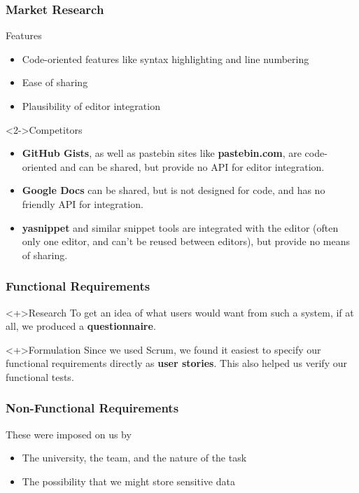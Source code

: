 
\begin{frame}
  \frametitle{Market Research}

  \begin{block}{Features}
    \begin{itemize}
      \item Code-oriented features like syntax highlighting and line numbering
      \item Ease of sharing
      \item Plausibility of editor integration
    \end{itemize}
  \end{block}

  \begin{block}<2->{Competitors}
    \begin{itemize}
      \item<-2> \textbf{GitHub Gists}, as well as pastebin sites like
        \textbf{pastebin.com}, are code-oriented and can be shared,
        but provide no API for editor integration.

      \item<1,3> \textbf{Google Docs} can be shared, but is not
        designed for code, and has no friendly API for integration.

      \item<1,4> \textbf{yasnippet} and similar snippet tools are
        integrated with the editor (often only one editor, and can't
        be reused between editors), but provide no means of sharing.
    \end{itemize}
  \end{block}
\end{frame}

\begin{frame}
  \frametitle{Functional Requirements}

  \begin{block}<+>{Research}
    To get an idea of what users would want from such a system, if at
    all, we produced a \textbf{questionnaire}.
  \end{block}

  \begin{block}<+>{Formulation}
    Since we used Scrum, we found it easiest to specify our functional
    requirements directly as \textbf{user stories}.  This also helped us
    verify our functional tests.
  \end{block}
\end{frame}

\begin{frame}
  \frametitle{Non-Functional Requirements}

  These were imposed on us by
  \begin{itemize}[<+>]
    \item The university, the team, and the nature of the task
    \item The possibility that we might store sensitive data
  \end{itemize}
\end{frame}
